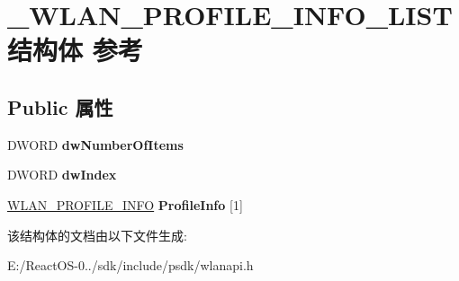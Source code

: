 \hypertarget{struct___w_l_a_n___p_r_o_f_i_l_e___i_n_f_o___l_i_s_t}{}\section{\+\_\+\+W\+L\+A\+N\+\_\+\+P\+R\+O\+F\+I\+L\+E\+\_\+\+I\+N\+F\+O\+\_\+\+L\+I\+S\+T结构体 参考}
\label{struct___w_l_a_n___p_r_o_f_i_l_e___i_n_f_o___l_i_s_t}
\subsection*{Public 属性}
\begin{DoxyCompactItemize}
\item 
\mbox{\label{struct___w_l_a_n___p_r_o_f_i_l_e___i_n_f_o___l_i_s_t_ae968634b94c371ecf8e09a44102b55e6}} 
D\+W\+O\+RD {\bfseries dw\+Number\+Of\+Items}
\item 
\mbox{\label{struct___w_l_a_n___p_r_o_f_i_l_e___i_n_f_o___l_i_s_t_a0fda2111b01ca270c5b0c04325aa7666}} 
D\+W\+O\+RD {\bfseries dw\+Index}
\item 
\mbox{\label{struct___w_l_a_n___p_r_o_f_i_l_e___i_n_f_o___l_i_s_t_aac04d14b7390ac7457348441d975b3ea}} 
\hyperlink{struct___w_l_a_n___p_r_o_f_i_l_e___i_n_f_o}{W\+L\+A\+N\+\_\+\+P\+R\+O\+F\+I\+L\+E\+\_\+\+I\+N\+FO} {\bfseries Profile\+Info} \mbox{[}1\mbox{]}
\end{DoxyCompactItemize}


该结构体的文档由以下文件生成\+:\begin{DoxyCompactItemize}
\item 
E\+:/\+React\+O\+S-\/0../sdk/include/psdk/wlanapi.\+h\end{DoxyCompactItemize}
